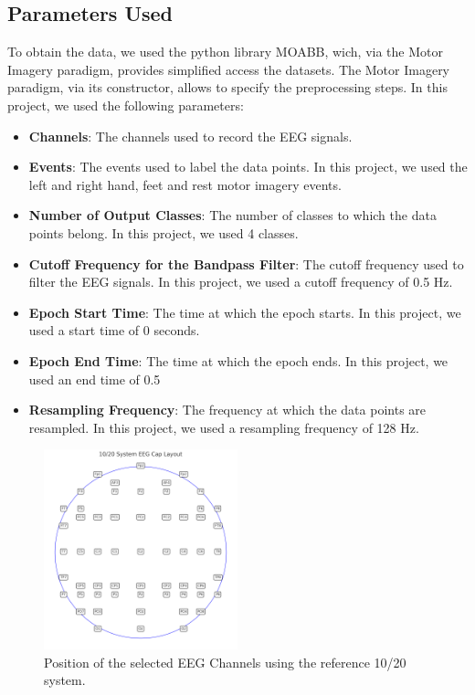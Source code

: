 \subsection*{Parameters Used}
To obtain the data, we used the python library MOABB, wich, via the Motor Imagery paradigm, provides simplified access the datasets.
The Motor Imagery paradigm, via its constructor, allows to specify the preprocessing steps.
In this project, we used the following parameters:
\begin{itemize}
    \item \textbf{Channels}: The channels used to record the EEG signals.
    \item \textbf{Events}: The events used to label the data points. In this project, we used the left and right hand, feet and rest motor imagery events.
    \item \textbf{Number of Output Classes}: The number of classes to which the data points belong. In this project, we used 4 classes.
    \item \textbf{Cutoff Frequency for the Bandpass Filter}: The cutoff frequency used to filter the EEG signals. In this project, we used a cutoff frequency of 0.5 Hz.
    \item \textbf{Epoch Start Time}: The time at which the epoch starts. In this project, we used a start time of 0 seconds.
    \item \textbf{Epoch End Time}: The time at which the epoch ends. In this project, we used an end time of 0.5
    \item \textbf{Resampling Frequency}: The frequency at which the data points are resampled. In this project, we used a resampling frequency of 128 Hz.
\end{itemize}
\begin{figure}[!htbp]
    \centering
    \includegraphics[width=0.5\textwidth]{Figures/Methodology/thesis_eeg_cap}
    \caption{Position of the selected EEG Channels using the reference 10/20 system.}
    \label{fig:eeg_channels}
\end{figure}




